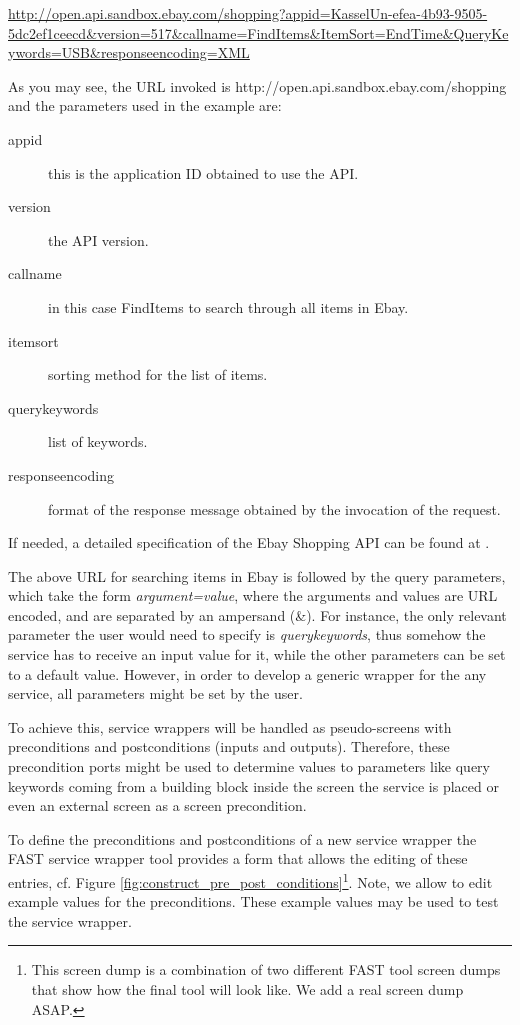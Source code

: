 \documentclass{fast_latex}
\begin{document}
\url{http://open.api.sandbox.ebay.com/shopping?appid=KasselUn-efea-4b93-9505-5dc2ef1ceecd&version=517&callname=FindItems&ItemSort=EndTime&QueryKeywords=USB&responseencoding=XML}

As you may see, the URL invoked is http://open.api.sandbox.ebay.com/shopping and the parameters used in the example are:
\begin{description}
	\item[appid] this is the application ID obtained to use the API.
	\item[version] the API version.
	\item[callname] in this case FindItems to search through all items in Ebay.
	\item[itemsort] sorting method for the list of items.
	\item[querykeywords] list of keywords.
	\item[responseencoding] format of the response message obtained by the invocation of the request.
\end{description}

If needed, a detailed specification of the Ebay Shopping API can be found at \cite{eBayShoppingAPIs}.

The above URL for searching items in Ebay is followed by the query parameters, which take the form \textit{argument=value}, where the arguments and values are URL encoded, and are separated by an ampersand (\&). For instance, the only relevant parameter the user would need to specify is \emph{querykeywords}, thus somehow the service has to receive an input value for it, while the other parameters can be set to a default value. However, in order to develop a generic wrapper for the any service, all parameters might be set by the user.

To achieve this, service wrappers will be handled as pseudo-screens with preconditions and postconditions (inputs and outputs). Therefore, these precondition ports might be used to determine values to parameters like query keywords coming from a building block inside the screen the service is placed or even an external screen as a screen precondition. 

To define the preconditions and postconditions of a new service wrapper the FAST service wrapper tool provides a form that allows the editing of these entries, cf. Figure \ref{fig:construct_pre_post_conditions}\footnote{This screen dump is a combination of two different FAST tool screen dumps that show how the final tool will look like. We add a real screen dump ASAP.}. Note, we allow to edit example values for the preconditions. These example values may be used to test the service wrapper. 
\end{document}
